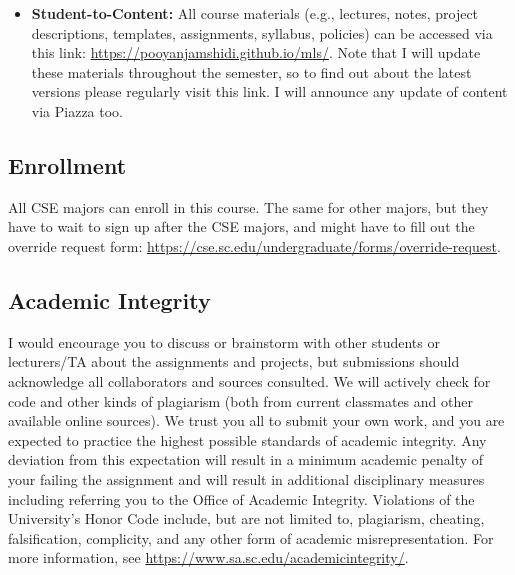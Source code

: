 \documentclass[11pt]{article}
\begin{document}
\begin{itemize}
\item \textbf{Student-to-Content:} All course materials (e.g., lectures, notes, project descriptions, templates, assignments, syllabus, policies) can be accessed via this link: \url{https://pooyanjamshidi.github.io/mls/}. Note that I will update these materials throughout the semester, so to find out about the latest versions please regularly visit this link. I will announce any update of content via Piazza too.

\end{itemize}


\subsection*{Enrollment}

All CSE majors can enroll in this course. The same for other majors, but they have to wait to sign up after the CSE majors, and might have to fill out the override request form: \url{https://cse.sc.edu/undergraduate/forms/override-request}.

\subsection*{Academic Integrity}

I would encourage you to discuss or brainstorm with other students or lecturers/TA about the assignments and projects, but submissions should acknowledge all collaborators and sources consulted. We will actively check for code and other kinds of plagiarism (both from current classmates and other available online sources). We trust you all to submit your own work, and you are expected to practice the highest possible standards of academic integrity. Any deviation from this expectation will result in a minimum academic penalty of your failing the assignment and will result in additional disciplinary measures including referring you to the Office of Academic Integrity. Violations of the University's Honor Code include, but are not limited to, plagiarism, cheating, falsification, complicity, and any other form of academic misrepresentation. For more information, see \url{https://www.sa.sc.edu/academicintegrity/}.
\end{document}
